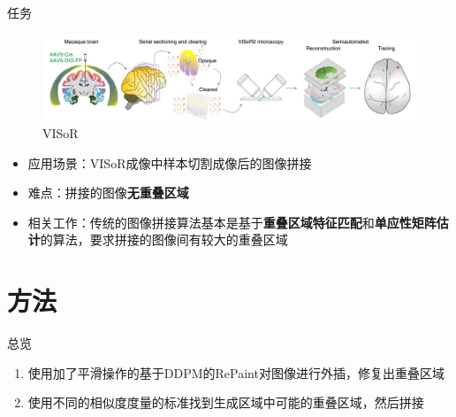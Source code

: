 \documentclass[10pt]{beamer}
\begin{document}
\begin{frame}[fragile]{任务}
  \begin{figure}[thbp!]
    \centering
    \includegraphics[width=1\linewidth]{imgs/VISoR.png}
    \caption{VISoR}
    \label{fig:VISoR}
    \end{figure}



  \begin{itemize}
    \item 应用场景：VISoR\cite{xuHighthroughputMappingWhole2021}成像中样本切割成像后的图像拼接
    \item 难点：拼接的图像\textbf{无重叠区域}
    \item 相关工作：传统的图像拼接算法基本是基于\textbf{重叠区域特征匹配}和\textbf{单应性矩阵估计}的算法，要求拼接的图像间有较大的重叠区域
  \end{itemize}
\end{frame}

\section{方法}

\begin{frame}[fragile]{总览}
  \begin{enumerate}
    \item 使用加了平滑操作的基于DDPM\cite{ho2020denoising}的RePaint\cite{lugmayr2022repaint}对图像进行外插，修复出重叠区域
    \item 使用不同的相似度度量的标准找到生成区域中可能的重叠区域，然后拼接
  \end{enumerate}
\end{frame}
\end{document}
